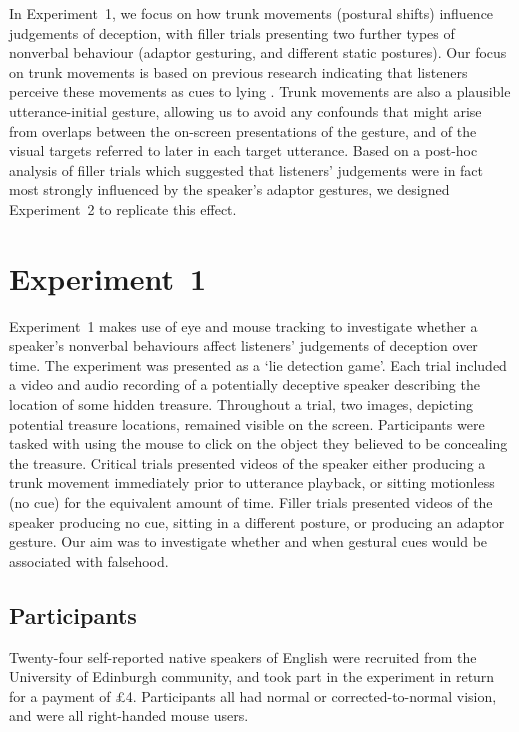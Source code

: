 \documentclass[a4paper,man,natbib]{apa6}
\begin{document}
In Experiment~1, we focus on how trunk movements (postural shifts) influence judgements of deception, with filler trials presenting two further types of nonverbal behaviour (adaptor gesturing, and different static postures).
Our focus on trunk movements is based on previous research indicating that listeners perceive these movements as cues to lying \citep{Vrij1996a, Zuckerman1981}.
Trunk movements are also a plausible  utterance-initial gesture, allowing us to avoid any confounds that might arise from overlaps between the on-screen presentations of the gesture, and of the visual targets referred to later in each target utterance. %
Based on a post-hoc analysis of filler trials which suggested that listeners' judgements were in fact most strongly influenced by the speaker's adaptor gestures, we designed Experiment~2 to replicate this effect.

\section{Experiment~1}
Experiment~1 makes use of eye  and mouse tracking to investigate whether a speaker's nonverbal behaviours affect listeners' judgements of deception over time. 
The experiment was presented as a `lie detection game'.
Each trial included a video and audio recording of a potentially deceptive speaker describing the location of some hidden treasure.
Throughout a trial, two images, depicting potential treasure locations, remained visible on the screen. 
Participants were tasked with using the mouse to click on the object they believed to be concealing the treasure.
Critical trials presented videos of the speaker either producing a trunk movement immediately prior to utterance playback, or sitting motionless (no cue) for the equivalent amount of time.
Filler trials presented videos of the speaker producing no cue, sitting in a different posture, or producing an adaptor gesture. 
Our aim was to investigate whether and when gestural cues would be associated with falsehood.

\subsection{Participants}
Twenty-four self-reported native speakers of English were recruited from the University of Edinburgh community, and took part in the experiment in return for a payment of \pounds{}4.
Participants all had normal or corrected-to-normal vision, and were all right-handed mouse users.
\end{document}
